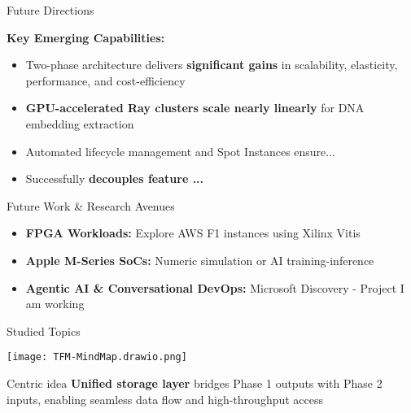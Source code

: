 \documentclass[aspectratio=169]{beamer}
\begin{document}
\begin{frame}{Future Directions}

            \textbf{Key Emerging Capabilities:}
            \begin{itemize}
                \item Two-phase architecture delivers \textbf{significant gains} in scalability, elasticity, performance, and cost-efficiency
                \item \textcolor{rayblue}{\textbf{GPU-accelerated Ray clusters scale nearly linearly}} for DNA embedding extraction
                \item Automated lifecycle management and Spot Instances ensure...
                \item Successfully \textbf{decouples feature ...}
            \end{itemize}

    
    \vspace{0.3cm}
    \begin{block}{Future Work \& Research Avenues}
        \begin{itemize}
            \item \textbf{FPGA Workloads:} Explore AWS F1 instances using Xilinx Vitis
            \item \textbf{Apple M-Series SoCs:} Numeric simulation or AI training-inference
            \item \textbf{Agentic AI \& Conversational DevOps:} Microsoft Discovery - Project I am working
        \end{itemize}
    \end{block}
\end{frame}

\begin{frame}{Studied Topics}
    \begin{center}
        \texttt{[image: TFM-MindMap.drawio.png]}
    \end{center}
    
    \vspace{0.3cm}
    \begin{block}{Centric idea}
        \textbf{Unified storage layer} bridges Phase 1 outputs with Phase 2 inputs, enabling seamless data flow and high-throughput access
    \end{block}
\end{frame}
\end{document}

